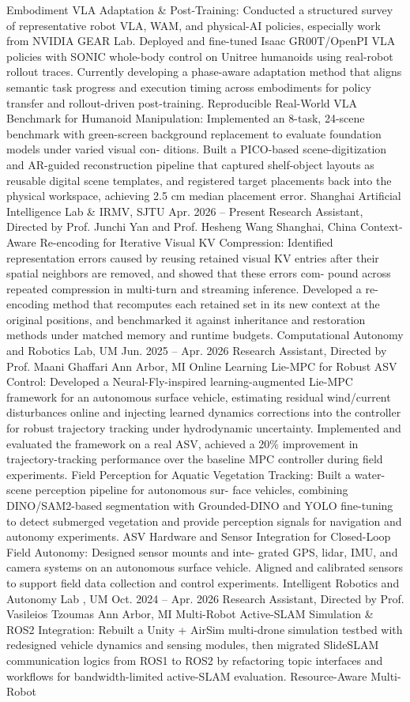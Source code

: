 \documentclass[10pt,letterpaper]{article}
\begin{document}
Embodiment VLA Adaptation \& Post-Training: Conducted a structured survey of representative robot VLA, WAM, and physical-AI policies, especially work from NVIDIA GEAR Lab. Deployed and fine-tuned Isaac GR00T/OpenPI VLA policies with SONIC whole-body control on Unitree humanoids using real-robot rollout traces. Currently developing a phase-aware adaptation method that aligns semantic task progress and execution timing across embodiments for policy transfer and rollout-driven post-training.  Reproducible Real-World VLA Benchmark for Humanoid Manipulation: Implemented an 8-task, 24-scene benchmark with green-screen background replacement to evaluate foundation models under varied visual con- ditions. Built a PICO-based scene-digitization and AR-guided reconstruction pipeline that captured shelf-object layouts as reusable digital scene templates, and registered target placements back into the physical workspace, achieving 2.5 cm median placement error. Shanghai Artificial Intelligence Lab \& IRMV, SJTU Apr. 2026 -- Present Research Assistant, Directed by Prof. Junchi Yan and Prof. Hesheng Wang Shanghai, China  Context-Aware Re-encoding for Iterative Visual KV Compression: Identified representation errors caused by reusing retained visual KV entries after their spatial neighbors are removed, and showed that these errors com- pound across repeated compression in multi-turn and streaming inference. Developed a re-encoding method that recomputes each retained set in its new context at the original positions, and benchmarked it against inheritance and restoration methods under matched memory and runtime budgets. Computational Autonomy and Robotics Lab, UM Jun. 2025 -- Apr. 2026 Research Assistant, Directed by Prof. Maani Ghaffari Ann Arbor, MI  Online Learning Lie-MPC for Robust ASV Control: Developed a Neural-Fly-inspired learning-augmented Lie-MPC framework for an autonomous surface vehicle, estimating residual wind/current disturbances online and injecting learned dynamics corrections into the controller for robust trajectory tracking under hydrodynamic uncertainty. Implemented and evaluated the framework on a real ASV, achieved a 20\% improvement in trajectory-tracking performance over the baseline MPC controller during field experiments.  Field Perception for Aquatic Vegetation Tracking: Built a water-scene perception pipeline for autonomous sur- face vehicles, combining DINO/SAM2-based segmentation with Grounded-DINO and YOLO fine-tuning to detect submerged vegetation and provide perception signals for navigation and autonomy experiments.  ASV Hardware and Sensor Integration for Closed-Loop Field Autonomy: Designed sensor mounts and inte- grated GPS, lidar, IMU, and camera systems on an autonomous surface vehicle. Aligned and calibrated sensors to support field data collection and control experiments. Intelligent Robotics and Autonomy Lab , UM Oct. 2024 -- Apr. 2026 Research Assistant, Directed by Prof. Vasileios Tzoumas Ann Arbor, MI  Multi-Robot Active-SLAM Simulation \& ROS2 Integration: Rebuilt a Unity + AirSim multi-drone simulation testbed with redesigned vehicle dynamics and sensing modules, then migrated SlideSLAM communication logics from ROS1 to ROS2 by refactoring topic interfaces and workflows for bandwidth-limited active-SLAM evaluation.  Resource-Aware Multi-Robot 
\end{document}
